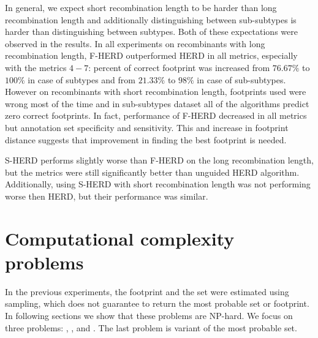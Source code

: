 In general, we expect short recombination length to be harder than long
recombination length and additionally distinguishing between sub-subtypes is
harder than distinguishing between subtypes. Both of these expectations were
observed in the results. In all experiments on recombinants with long
recombination length, F-HERD outperformed HERD in all metrics, especially with
the metrics $4-7$: percent of correct footprint was increased from $76.67\%$ to
$100\%$ in case of subtypes and from $21.33\%$ to $98\%$ in case of
sub-subtypes. However on recombinants with short recombination length,
footprints used were wrong most of the time and in sub-subtypes dataset all of
the algorithms predict zero correct footprints.  In fact, performance of F-HERD
decreased in all metrics but annotation set specificity and sensitivity. This
and increase in footprint distance suggests that improvement in finding the best
footprint is needed.


S-HERD performs slightly worse than F-HERD on the long recombination length, but
the metrics were still significantly better than unguided HERD algorithm.
Additionally, using S-HERD with short recombination length was not performing
worse then HERD, but their performance was similar.

\section{Computational complexity problems}

In the previous experiments, the footprint and the set were estimated using
sampling, which does not guarantee to return the most probable set or footprint.
In following sections we show that these problems are NP-hard.  We focus on
three problems: , , and . The last problem is variant of the most probable set.

